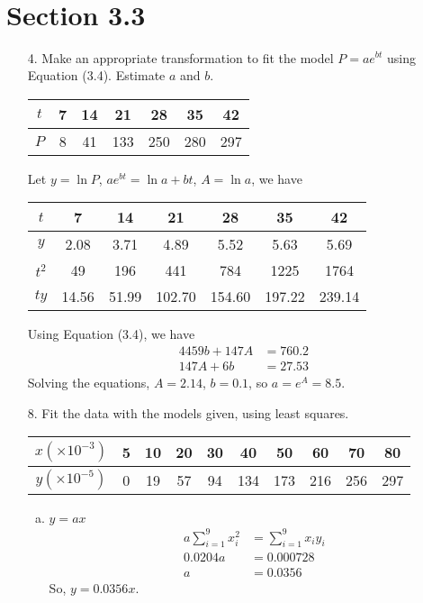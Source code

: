 \documentclass[10pt]{report}
\title{
	\courseTitle\\
	\hwNo\\
	\hwDate
}
\author{\hwAuther}
\date{}
\begin{document}
\maketitle

\section*{Section 3.3}
\begin{enumerate}
	\item [4.]
	Make an appropriate transformation to fit the model $P=ae^{bt}$ using Equation (3.4). Estimate $a$ and $b$.
	\begin{table}[H]
		\centering
		\begin{tabular}{*{7}{c}} 
			\toprule
			$t$ & 7 & 14 & 21 & 28 & 35 & 42 \\ \midrule
			$P$ & 8 & 41 & 133 & 250 & 280 & 297 \\
			\bottomrule
		\end{tabular}
	\end{table}
	Let $y=\ln{P}$, $ae^{bt} = \ln{a} + bt$, $A=\ln{a}$, we have
	\begin{table}[H]
		\centering
		\begin{tabular}{*{7}{c}} 
			\toprule
			$t$ & 7 & 14 & 21 & 28 & 35 & 42 \\ \midrule
			$y$ & 2.08 & 3.71 & 4.89 & 5.52 & 5.63 & 5.69 \\
			\midrule
			$t^2$ & 49 & 196 & 441 & 784 & 1225 & 1764 \\
			\midrule
			$t y$ & 14.56 & 51.99 & 102.70 & 154.60 & 197.22 & 239.14 \\
			\bottomrule
		\end{tabular}
	\end{table}
	Using Equation (3.4), we have
	\begin{align*}
		4459b + 147A &= 760.2\\
		147A + 6b &= 27.53
	\end{align*}
	Solving the equations, $A=2.14$, $b=0.1$, so $a = e^A = 8.5$.

	\item [8.]
	Fit the data with the models given, using least squares.
	\begin{table}[H]
		\centering
		\begin{tabular}{*{10}{c}} 
			\toprule
			$x(\times 10^{-3})$ & 5 & 10 & 20 & 30 & 40 & 50 & 60 & 70 & 80 \\ \midrule
			$y(\times 10^{-5})$ & 0 & 19 & 57 & 94 & 134 & 173 & 216 & 256 & 297 \\
			\bottomrule
		\end{tabular}
	\end{table}
	\begin{enumerate}[a.]
		\item 
		$y=ax$
		\begin{align*}
			a \sum_{i=1}^{9} x_i^2 &= \sum_{i=1}^{9} x_i y_i\\
			0.0204a &= 0.000728\\
			a &= 0.0356
		\end{align*}
		So, $y=0.0356x$.
		

\end{enumerate}
\end{enumerate}
\end{document}
